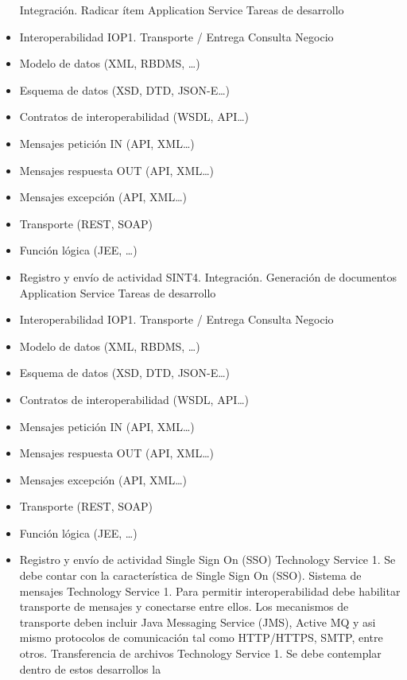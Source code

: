 \documentclass[
  paper=a4,
  ,captions=tableheading
]{scrartcl}
\begin{document}
\begin{itemize}
  Integración. Radicar ítem \textbar{} Application Service \textbar{}
  Tareas de desarrollo
\item
  Interoperabilidad IOP1. Transporte / Entrega Consulta Negocio
\item
  Modelo de datos (XML, RBDMS, \ldots)
\item
  Esquema de datos (XSD, DTD, JSON-E\ldots)
\item
  Contratos de interoperabilidad (WSDL, API\ldots)
\item
  Mensajes petición IN (API, XML\ldots)
\item
  Mensajes respuesta OUT (API, XML\ldots)
\item
  Mensajes excepción (API, XML\ldots)
\item
  Transporte (REST, SOAP)
\item
  Función lógica (JEE, \ldots)
\item
  Registro y envío de actividad \textbar{} \textbar{} SINT4.
  Integración. Generación de documentos \textbar{} Application Service
  \textbar{} Tareas de desarrollo
\item
  Interoperabilidad IOP1. Transporte / Entrega Consulta Negocio
\item
  Modelo de datos (XML, RBDMS, \ldots)
\item
  Esquema de datos (XSD, DTD, JSON-E\ldots)
\item
  Contratos de interoperabilidad (WSDL, API\ldots)
\item
  Mensajes petición IN (API, XML\ldots)
\item
  Mensajes respuesta OUT (API, XML\ldots)
\item
  Mensajes excepción (API, XML\ldots)
\item
  Transporte (REST, SOAP)
\item
  Función lógica (JEE, \ldots)
\item
  Registro y envío de actividad \textbar{} \textbar{} Single Sign On
  (SSO) \textbar{} Technology Service \textbar{} 1. Se debe contar con
  la característica de Single Sign On (SSO). \textbar{} \textbar{}
  Sistema de mensajes \textbar{} Technology Service \textbar{} 1. Para
  permitir interoperabilidad debe habilitar transporte de mensajes y
  conectarse entre ellos. Los mecanismos de transporte deben incluir
  Java Messaging Service (JMS), Active MQ y asi mismo protocolos de
  comunicación tal como HTTP/HTTPS, SMTP, entre otros. \textbar{}
  \textbar{} Transferencia de archivos \textbar{} Technology Service
  \textbar{} 1. Se debe contemplar dentro de estos desarrollos la

\end{itemize}
\end{document}
